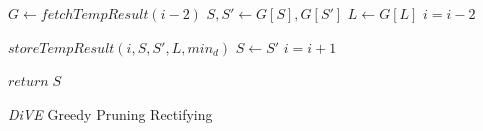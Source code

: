 \documentclass{article}
\begin{document}
\begin{algorithm}
{{%

$ G \leftarrow fetchTempResult(i- 2)$\;
$ S, S' \leftarrow G[S], G[S'] $ \;
$ L \leftarrow G[L] $ \;
$i = i- 2  $\;
			
			
			
		}{
			$ storeTempResult(i, S, S', L, min_d)$\;
			$ S \leftarrow S' $ \;
			$i = i + 1  $\;
		}
		
		
		
		
		
		
		
		
		
	}
	$return\; S$
	\caption{\textit{DiVE} Greedy Pruning Rectifying}\label{DiVE-Greedy-Pruning-Rectifying}
\end{algorithm}


\end{document}
